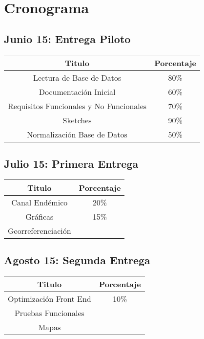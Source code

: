 \section{Cronograma}

\subsection{Junio 15: Entrega Piloto}

\begin{center}
\begin{tabular}{|c|c|}
\hline 
Titulo & Porcentaje \\ \hline
\hline
Lectura de Base de Datos & 80\% \\ \hline
Documentación Inicial & 60\% \\ \hline
Requisitos Funcionales y No Funcionales & 70\%\\ \hline
Sketches & 90\%\\ \hline
Normalización Base de Datos & 50\%\\ \hline

\end{tabular}
\end{center}

\subsection{Julio 15: Primera Entrega}

\begin{center}
\begin{tabular}{|c|c|}
\hline 
Titulo & Porcentaje \\ \hline
\hline
Canal Endémico & 20\% \\ \hline
Gráficas & 15\% \\ \hline
Georreferenciación & \\ \hline
\end{tabular}
\end{center}


\subsection{Agosto 15: Segunda Entrega }


\begin{center}
\begin{tabular}{|c|c|}
\hline 
Titulo & Porcentaje \\ \hline
\hline
Optimización Front End &  10\% \\ \hline
Pruebas Funcionales & \\ \hline
Mapas & \\ \hline
\end{tabular}
\end{center}

